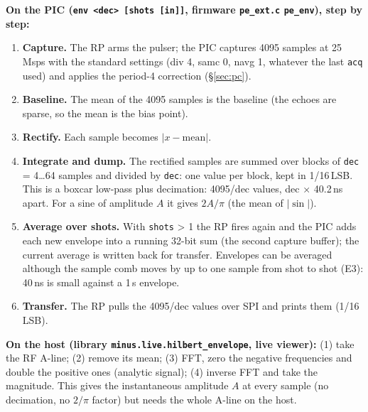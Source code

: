 \documentclass[10pt,a4paper]{article}
\newcommand{\us}{\,\textmu s}
\newcommand{\cmd}[1]{\texttt{#1}}
\begin{document}
\textbf{On the PIC (\cmd{env <dec> [shots [in]]}, firmware \texttt{pe\_ext.c} \texttt{pe\_env}), step by step:}
\begin{enumerate}[nosep]
  \item \textbf{Capture.} The RP arms the pulser; the PIC captures 4095 samples at 25\,Msps with the standard settings (div 4, samc 0,
        navg 1, whatever the last \cmd{acq} used) and applies the period-4 correction (\S\ref{sec:pc}).
  \item \textbf{Baseline.} The mean of the 4095 samples is the baseline (the echoes are sparse, so the mean is the bias point).
  \item \textbf{Rectify.} Each sample becomes $|x - \text{mean}|$.
  \item \textbf{Integrate and dump.} The rectified samples are summed over blocks of \cmd{dec} = 4…64 samples and divided by \cmd{dec}:
        one value per block, kept in 1/16\,LSB. This is a boxcar low-pass plus decimation: 4095/dec values, dec × 40.2\,ns apart.
        For a sine of amplitude $A$ it gives $2A/\pi$ (the mean of $|\sin|$).
  \item \textbf{Average over shots.} With \cmd{shots} > 1 the RP fires again and the PIC adds each new envelope into a running
        32-bit sum (the second capture buffer); the current average is written back for transfer. Envelopes can be averaged
        although the sample comb moves by up to one sample from shot to shot (E3): 40\,ns is small against a 1\us{} envelope.
  \item \textbf{Transfer.} The RP pulls the 4095/dec values over SPI and prints them (1/16\,LSB).
\end{enumerate}
\textbf{On the host (library \texttt{minus.live.hilbert\_envelope}, live viewer):} (1) take the RF A-line; (2) remove its mean;
(3) FFT, zero the negative frequencies and double the positive ones (analytic signal); (4) inverse FFT and take the magnitude.
This gives the instantaneous amplitude $A$ at every sample (no decimation, no $2/\pi$ factor) but needs the whole A-line on the host.
\end{document}
